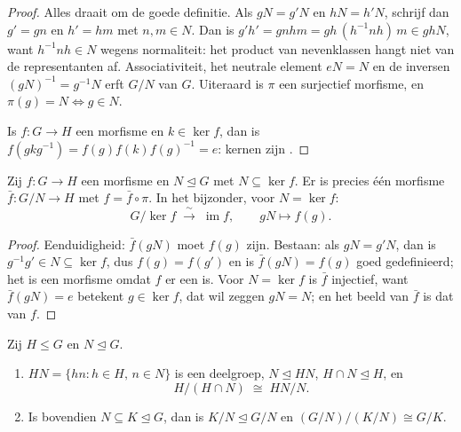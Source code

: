 \begin{proof}
Alles draait om de goede definitie. Als $gN = g'N$ en $hN = h'N$,
schrijf dan $g' = gn$ en $h' = hm$ met $n, m \in N$. Dan is $g'h' =
gnhm = gh\,(h^{-1}nh)\,m \in ghN$, want $h^{-1}nh \in N$ wegens
normaliteit: het product van nevenklassen hangt niet van de
representanten af. Associativiteit, het neutrale element $eN = N$
en de inversen $(gN)^{-1} = g^{-1}N$ erft $G/N$ van $G$. Uiteraard
is $\pi$ een surjectief morfisme, en $\pi(g) = N \iff g \in N$.

Is $f \colon G \to H$ een morfisme en $k \in \ker f$, dan is
$f(gkg^{-1}) = f(g)f(k)f(g)^{-1} = e$: kernen zijn .
\end{proof}

\begin{theorem}
\label{thm:b3:groups:firstiso}
Zij $f \colon G \to H$ een morfisme en $N \trianglelefteq G$ met
$N \subseteq \ker f$. Er is precies één morfisme $\bar f \colon G/N
\to H$ met $f = \bar f \circ \pi$. In het bijzonder, voor $N = \ker
f$:
\[
G/\ker f \;\xrightarrow{\;\sim\;}\; \operatorname{im} f,
\qquad gN \mapsto f(g).
\]
\end{theorem}

\begin{proof}
Eenduidigheid: $\bar f(gN)$ moet $f(g)$ zijn. Bestaan: als $gN =
g'N$, dan is $g^{-1}g' \in N \subseteq \ker f$, dus $f(g) = f(g')$
en is $\bar f(gN) = f(g)$ goed gedefinieerd; het is een morfisme
omdat $f$ er een is. Voor $N = \ker f$ is $\bar f$ injectief, want
$\bar f(gN) = e$ betekent $g \in \ker f$, dat wil zeggen $gN = N$;
en het beeld van $\bar f$ is dat van $f$.
\end{proof}

\begin{theorem}
\label{thm:b3:groups:secondiso}
Zij $H \leq G$ en $N \trianglelefteq G$.
\begin{enumerate}
  \item $HN = \{hn : h \in H,\, n \in N\}$ is een deelgroep, $N
        \trianglelefteq HN$, $H \cap N \trianglelefteq H$, en
        \[
        H/(H \cap N) \;\cong\; HN/N .
        \]
  \item Is bovendien $N \subseteq K \trianglelefteq G$, dan is $K/N
        \trianglelefteq G/N$ en $(G/N)\big/(K/N) \cong G/K$.
\end{enumerate}
\end{theorem}

